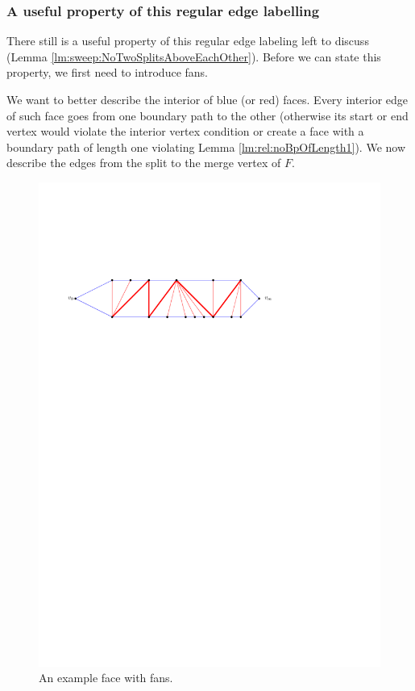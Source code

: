 \subsubsection{A useful property of this regular edge labelling}
  There still is a useful property of this regular edge labeling left to discuss (Lemma \ref{lm:sweep:NoTwoSplitsAboveEachOther}). Before we can state this property, we first need to introduce fans.

    We want to better describe the interior of blue (or red) faces. Every interior edge of such face goes from one boundary path to the other (otherwise its start or end vertex would violate the interior vertex condition or create a face with a boundary path of length one violating Lemma \ref{lm:rel:noBpOfLength1}). We now describe the edges from the split to the merge vertex of $F$.

    \begin{figure}[t]
      \centering
      \includegraphics[scale=.9]{rectangularDuals/img/fans}
      \caption{An example face with fans.}
      \label{fig:uni:fans}
    \end{figure}

